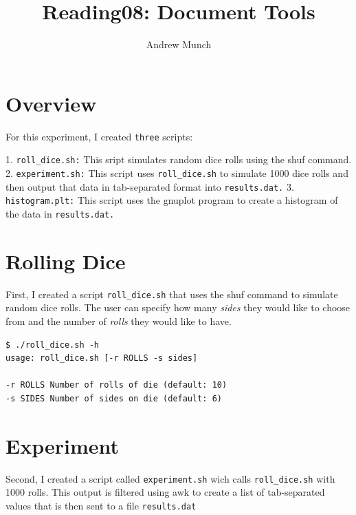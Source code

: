 \documentclass[letterpaper]{article}
\title{Reading08: Document Tools}
\date{}
\author{Andrew Munch}
\begin{document}
\maketitle


\section*{Overview}

For this experiment, I created \verb|three| scripts:

   1. \verb|roll_dice.sh:| This sript simulates random dice rolls using the shuf command.
   2. \verb|experiment.sh:| This script uses \verb|roll_dice.sh| to simulate 1000 dice rolls and then output that data in tab-separated format into \verb|results.dat.|
   3. \verb|histogram.plt:| This script uses the gnuplot program to create a histogram of the data in \verb|results.dat.|


\section*{Rolling Dice}

First, I created a script \verb|roll_dice.sh| that uses the shuf command to simulate random dice rolls.  The user can specify how many {\it sides} they would like to choose from and the number of {\it rolls} they would like to have.

\begin{verbatim}
$ ./roll_dice.sh -h
usage: roll_dice.sh [-r ROLLS -s sides]

-r ROLLS Number of rolls of die (default: 10)
-s SIDES Number of sides on die (default: 6)
\end{verbatim}


\section*{Experiment}

Second, I created a script called \verb|experiment.sh| wich calls \verb|roll_dice.sh| with 1000 rolls.  This output is filtered using awk to create a list of tab-separated values that is then sent to a file \verb|results.dat|

\end{document}
